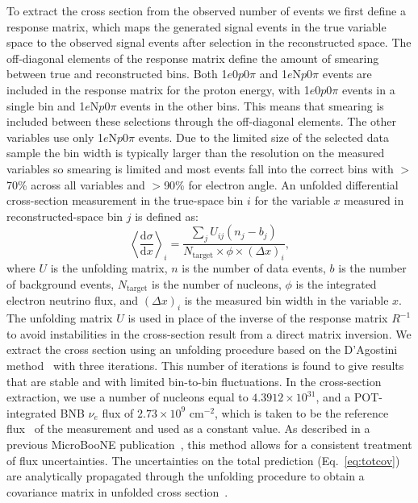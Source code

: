 \documentclass[reprint,
 amsmath,amssymb,
 aps,prd,
 superscriptaddress,
 twocolumn, longbibliography
]{revtex4-1}
\newcommand{\nue}{$\nu_e$\xspace}
\newcommand{\npsel}{1$e$N$p$0$\pi$\xspace}
\newcommand{\zpsel}{1$e$0$p$0$\pi$\xspace}
\begin{document}
To extract the cross section from the observed number of events we first define a response matrix, which maps the generated signal events in the true variable space to the observed signal events after selection in the reconstructed space. The off-diagonal elements of the response matrix define the amount of smearing between true and reconstructed bins. Both \zpsel and \npsel events are included in the response matrix for the proton energy, with \zpsel events in a single bin and \npsel events in the other bins.  This means that smearing is included between these selections through the off-diagonal elements.
The other variables use only \npsel events.
Due to the limited size of the selected data sample the bin width is typically larger than the resolution on the measured variables so smearing is limited and most events fall into the correct bins with $>$70\% across all variables and $>$90\% for electron angle.
An unfolded differential cross-section measurement in the true-space bin $i$ for the variable $x$ measured in reconstructed-space bin $j$ is defined as:
\begin{equation}\label{eq:xsec}
    \left \langle\frac{\textrm{d}\sigma}{\textrm{d}x}\right \rangle_i = \frac{\sum_j U_{ij}(n_j - b_j)}{N_{\text{target}} \times \phi \times (\Delta x)_i},
\end{equation}
where $U$ is the unfolding matrix, $n$ is the number of data events, $b$ is the number of background events, $N_{\textrm{target}}$ is the number of nucleons, $\phi$ is the integrated electron neutrino flux, and $(\Delta x)_i$ is the measured bin width in the variable $x$. The unfolding matrix $U$ is used in place of the inverse of the response matrix $R^{-1}$ to avoid instabilities in the cross-section result from a direct matrix inversion.
We extract the cross section using an unfolding procedure based on the D'Agostini method~\cite{DAgUnfold} with three iterations. 
This number of iterations is found to give results that are stable and with limited bin-to-bin fluctuations.
In the cross-section extraction, we use a number of nucleons equal to $4.3912 \times 10^{31}$, and a POT-integrated BNB \nue flux of $2.73 \times 10^{9}$ cm$^{-2}$, which is taken to be the reference flux~\cite{Koch:2020oyf} of the measurement and used as a constant value. As described in a previous MicroBooNE publication~\cite{MicroBooNECollaboration:2021enn}, this method allows for a consistent treatment of flux uncertainties. The uncertainties on the total prediction (Eq.~\ref{eq:totcov}) are analytically propagated through the unfolding procedure to obtain a covariance matrix in unfolded cross section~\cite{Bourbeau:2018wiw}.
\end{document}
